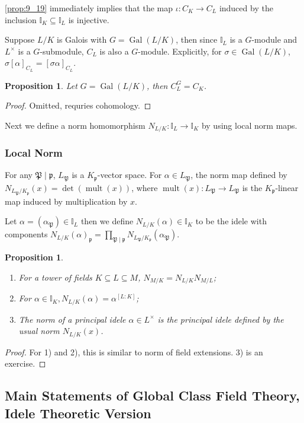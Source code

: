 \documentclass[11pt]{article}
\theoremstyle{definition}
\theoremstyle{plain}
\newtheorem{proposition}[definition]{Proposition}
\theoremstyle{remark}
\DeclareMathOperator{\Gal}{Gal}
\DeclareMathOperator{\mult}{mult}
\newcommand{\II}{\mathbb{I}}
\newcommand{\cp}{\mathfrak{P}}
\newcommand{\fp}{\mathfrak{p}}
\begin{document}
\autoref{prop:9_19} immediately implies that the map $\iota : C_K \to C_L$ induced by the inclusion $\II_K \subseteq \II_L$ is injective.

Suppose $L/K$ is Galois with $G = \Gal(L/K)$, then since $\II_L$ is a $G$-module and $L^\times$ is a $G$-submodule, $C_L$ is also a $G$-module. Explicitly, for $\sigma \in \Gal(L/K)$, $\sigma [\alpha]_{C_L} = [\sigma \alpha]_{C_L}$.

\begin{proposition}
    Let $G = \Gal(L/K)$, then $C_L^G = C_K$.
\end{proposition}
\begin{proof}
    Omitted, requries cohomology.
\end{proof}

Next we define a norm homomorphism $N_{L/K} : \II_L \to \II_K$ by using local norm maps.

\subsubsection*{Local Norm}
For any $\cp \mid \fp$, $L_\cp$ is a $K_\fp$-vector space. For $\alpha \in L_\cp$, the norm map defined by $N_{L_\cp/K_\fp}(x) = \det(\mult(x))$, where $\mult(x) : L_\cp \to L_\cp$ is the $K_\fp$-linear map induced by multiplication by $x$.

Let $\alpha = (\alpha_\cp) \in \II_L$ then we define $N_{L/K}(\alpha) \in \II_K$ to be the idele with components $N_{L/K}(\alpha)_\fp = \prod_{\cp \mid \fp} N_{L_\cp / K_\fp}(\alpha_\cp)$.

\begin{proposition}\label{prop:9_21}\phantom{}
    \begin{enumerate}
        \item For a tower of fields $K \subseteq L \subseteq M$, $N_{M/K} = N_{L/K} N_{M/L}$;
        \item For $\alpha \in \II_K, N_{L/K}(\alpha) = \alpha^{[L:K]}$;
        \item The norm of a principal idele $\alpha \in L^\times$ is the principal idele defined by the usual norm $N_{L/K}(x)$.
    \end{enumerate}
\end{proposition}
\begin{proof}
    For 1) and 2), this is similar to norm of field extensions. 3) is an exercise.
\end{proof}

\subsection{Main Statements of Global Class Field Theory, Idele Theoretic Version}
\end{document}
